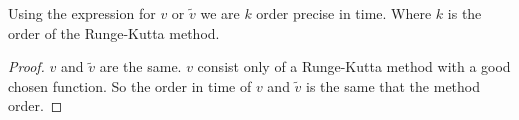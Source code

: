\begin{cor}
  Using the expression for $v$ or $\tilde{v}$ we are $k$ order precise in time. Where $k$ is the order of the Runge-Kutta method.
\end{cor}
\begin{proof}
  $v$ and $\tilde{v}$ are the same.
  $v$ consist only of a Runge-Kutta method with a good chosen function.
  So the order in time of $v$ and $\tilde{v}$ is the same that the method order.
\end{proof}

